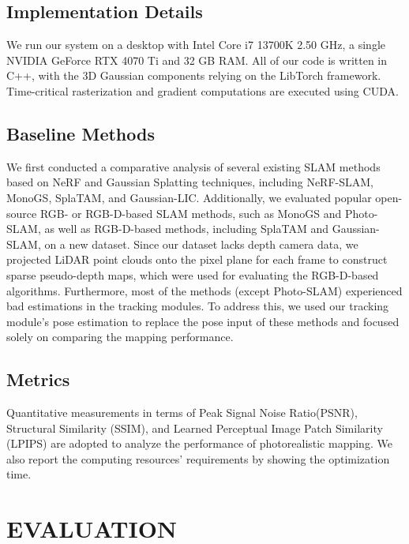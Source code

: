 \documentclass[lettersize,journal]{IEEEtran}
\begin{document}
\subsection{Implementation Details}
We run our system on a desktop with Intel Core i7 13700K 2.50 GHz, a single NVIDIA GeForce RTX 4070 Ti and 32 GB RAM. All of our code is written in C++, with the 3D Gaussian components relying on the LibTorch framework. Time-critical rasterization and gradient computations are executed using CUDA.

\subsection{Baseline Methods} 
We first conducted a comparative analysis of several existing SLAM methods based on NeRF and Gaussian Splatting techniques, including NeRF-SLAM\cite{nerfslam}, MonoGS\cite{monogs}, SplaTAM\cite{splatam}, and Gaussian-LIC\cite{gaussianlic}. Additionally, we evaluated popular open-source RGB- or RGB-D-based SLAM methods, such as MonoGS\cite{monogs} and Photo-SLAM\cite{photoslam}, as well as RGB-D-based methods, including SplaTAM\cite{splatam} and Gaussian-SLAM\cite{gaussianslam}, on a new dataset. Since our dataset lacks depth camera data, we projected LiDAR point clouds onto the pixel plane for each frame to construct sparse pseudo-depth maps, which were used for evaluating the RGB-D-based algorithms. Furthermore, most of the methods (except Photo-SLAM) experienced bad estimations in the tracking modules. To address this, we used our tracking module's pose estimation to replace the pose input of these methods and focused solely on comparing the mapping performance.

\subsection{Metrics}
\label{subsec:metrics}
Quantitative measurements in terms of Peak Signal Noise Ratio(PSNR), Structural Similarity (SSIM), and Learned Perceptual Image Patch Similarity (LPIPS) are adopted to analyze the performance of photorealistic mapping. We also report the computing resources' requirements by showing the optimization time.

\section{EVALUATION}
\end{document}
